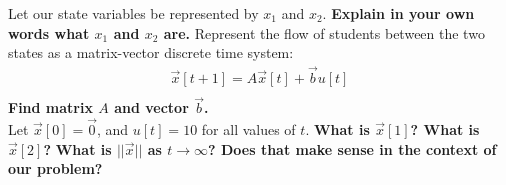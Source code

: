 \begin{enumerate}
    \qitem Let our state variables be represented by $x_1$ and $x_2$. \textbf{Explain in your own words what $x_1$ and $x_2$ are.}
    \vspace{2.5cm}
    \qitem Represent the flow of students between the two states as a matrix-vector discrete time system:
    \begin{align*}
        \vec{x}[t+1] =  A\vec{x}[t] + \vec{b}u[t]\\
    \end{align*}
    \textbf{Find matrix $A$ and vector $\vec{b}$.} \\
    \vspace{8cm}
    \qitem Let $\vec{x}[0] = \vec{0}$, and $u[t] = 10$ for all values of $t$. \textbf{What is $\vec{x}[1]$? What is $\vec{x}[2]$?} \textbf{What is $||\vec{x}||$ as $t\rightarrow\infty$? Does that make sense in the context of our problem?}


\end{enumerate}
